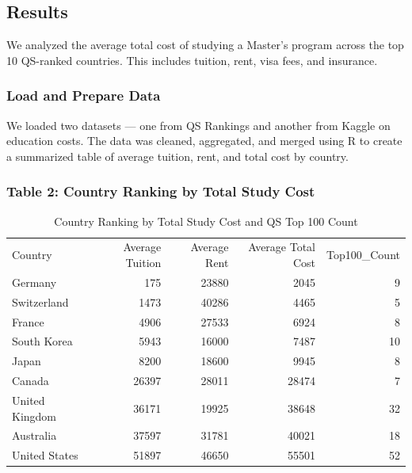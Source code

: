 \documentclass[
  letterpaper,
  DIV=11,
  numbers=noendperiod]{scrartcl}
\begin{document}
\subsection{Results}\label{results}

We analyzed the average total cost of studying a Master's program across
the top 10 QS-ranked countries. This includes tuition, rent, visa fees,
and insurance.

\subsubsection{Load and Prepare Data}\label{load-and-prepare-data}

We loaded two datasets --- one from QS Rankings and another from Kaggle
on education costs. The data was cleaned, aggregated, and merged using R
to create a summarized table of average tuition, rent, and total cost by
country.

\subsubsection{Table 2: Country Ranking by Total Study
Cost}\label{table-2-country-ranking-by-total-study-cost}

\begin{longtable}[t]{lrrrr}

\caption{\label{tbl-results}Country Ranking by Total Study Cost and QS
Top 100 Count}

\tabularnewline

\\
\toprule
Country & Average Tuition & Average Rent & Average Total Cost & Top100\_Count\\
\midrule
Germany & 175 & 23880 & 2045 & 9\\
Switzerland & 1473 & 40286 & 4465 & 5\\
France & 4906 & 27533 & 6924 & 8\\
South Korea & 5943 & 16000 & 7487 & 10\\
Japan & 8200 & 18600 & 9945 & 8\\
\addlinespace
Canada & 26397 & 28011 & 28474 & 7\\
United Kingdom & 36171 & 19925 & 38648 & 32\\
Australia & 37597 & 31781 & 40021 & 18\\
United States & 51897 & 46650 & 55501 & 52\\
\bottomrule

\end{longtable}
\end{document}
